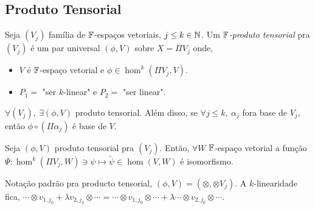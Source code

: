 \subsection{Produto Tensorial}

\begin{definition}
    Seja \((V_j)\) família de \(\mathbb{F}\)-espaços vetoriais, \(j\leq k \in \mathbb{N}\). Um \(\mathbb{F}\)\emph{-produto tensorial} pra \((V_j)\) é um par universal \((\phi, V)\) sobre \(X = \Pi V_j\) onde,   
    \vspace{-0.2cm}
    \begin{itemize}[left = 1cm]
        \item \(V\) é \(\mathbb{F}\)-espaço vetorial e \(\phi \in \hom^k(\Pi V_j, V)\). 
        \item \(P_1 = \) "ser $k$-linear" e \(P_2 = \) "ser linear".
    \end{itemize}  
\end{definition}

\hypertarget{thm1021}{}
\begin{theorem}
    \label{thm:1021}
    \(\forall (V_j),\ \exists (\phi, V)\) produto tensorial. Além disso, se \(\forall j\leq k, \ \alpha_j\) fora base de \(V_j\), então \(\phi \circ (\Pi \alpha_j)\) é base de \(V\).  
\end{theorem}


\begin{theorem}
    \label{thm:1022}
    Seja \((\phi, V)\) produto tensorial pra \((V_j)\). Então, \(\forall W\) \(\mathbb{F}\)-espaço vetorial a função \(\Psi: \hom^k(\Pi V_j, W) \ni \psi \mapsto \widetilde{\psi} \in \hom(V,W)\) é isomorfismo. 
\end{theorem}


\begin{note}
    Notação padrão pra producto tensorial, \(\textstyle (\phi, V) = \left(\otimes, \otimes V_j\right)\). A $k$-linearidade fica,  \( \cdots \otimes v_{1,j_0} + \lambda v_{2,j_0} \otimes \cdots = \cdots \otimes v_{1,j_0} \otimes \cdots + \lambda \cdots \otimes v_{2,j_0}\otimes \cdots \).
\end{note}

